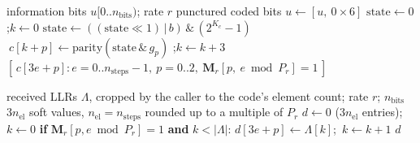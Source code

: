 \begin{algorithm}[H]
\caption{\textsc{ConvEncode} (\texttt{ConvCodecPunctured.encode}; \texttt{conv\_encode}).}
\label{alg:conv_enc}
\begin{algorithmic}[1]
\Require information bits $u[0..n_{\mathrm{bits}})$; rate $r$
\Ensure punctured coded bits
\State $u \gets [u,\ 0 \times 6]$ 
\State $\mathrm{state} \gets 0$;\quad $k \gets 0$
    \State $\mathrm{state} \gets ((\mathrm{state} \ll 1) \,|\, b) \,\&\, (2^{K_c} - 1)$ 
     $\ c[k{+}p] \gets \mathrm{parity}(\mathrm{state} \,\&\, g_p)$ \EndFor;\quad $k \gets k + 3$
\EndFor
\State \Return $[\,c[3e + p] : e = 0..n_{\mathrm{steps}}{-}1,\ p = 0..2,\ \mathbf{M}_r[p,\ e \bmod P_r] = 1\,]$ 
\end{algorithmic}
\end{algorithm}

\begin{algorithm}[H]
\caption{\textsc{Depuncture}.}
\label{alg:depunct}
\begin{algorithmic}[1]
\Require received LLRs $\Lambda$, cropped by the caller to the code's element count; rate $r$; $n_{\mathrm{bits}}$
\Ensure $3 n_{\mathrm{el}}$ soft values, $n_{\mathrm{el}} = n_{\mathrm{steps}}$ rounded up to a multiple of $P_r$
\State $d \gets 0$ ($3 n_{\mathrm{el}}$ entries);\quad $k \gets 0$
    \State \textbf{if} $\mathbf{M}_r[p, e \bmod P_r] = 1$ \textbf{and} $k < |\Lambda|$: $d[3e + p] \gets \Lambda[k]$;\ $k \gets k + 1$ 
\EndFor
\State \Return $d$
\end{algorithmic}
\end{algorithm}


